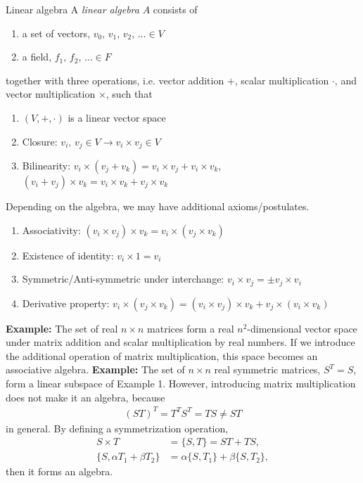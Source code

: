 \documentclass{beamer}
\begin{document}
\begin{frame}{Linear algebra}
\justify
A \textit{linear algebra} $A$ consists of
\begin{enumerate}
\item[A] a set of vectors, $v_0,\, v_1,\, v_2,\, \ldots \in V$
\item[B] a field, $f_1,\, f_2,\, \ldots \in F$
\end{enumerate}
together with three operations, i.e. vector addition $+$, scalar multiplication $\cdot$, and vector multiplication $\times$, such that
\begin{enumerate}
\item[1] $(V,+,\cdot)$ is a linear vector space
\item[2] Closure: $v_i,\, v_j\in V \rightarrow v_i \times v_j \in V$
\item[3] Bilinearity: $v_i \times (v_j + v_k) = v_i \times v_j + v_i \times v_k$, $(v_i + v_j) \times v_k = v_i \times v_k + v_j \times v_k$
\end{enumerate}
\vfill
Depending on the algebra, we may have additional axioms/postulates.
\begin{enumerate}
\item[4] Associativity: $(v_i \times v_j) \times v_k = v_i \times (v_j \times v_k)$
\item[5] Existence of identity: $v_i \times 1 = v_i$
\item[6] Symmetric/Anti-symmetric under interchange: $v_i \times v_j = \pm v_j \times v_i$
\item[7] Derivative property: $v_i \times (v_j \times v_k) = (v_i \times v_j) \times v_k + v_j \times (v_i \times v_k)$
\end{enumerate}
\end{frame}

\begin{frame}
\justify
\textbf{Example:} The set of real $n\times n$ matrices form a real $n^2$-dimensional vector space under matrix addition and scalar multiplication by real numbers. If we introduce the additional operation of matrix multiplication, this space becomes an associative algebra.
\vfill
\textbf{Example:} The set of $n\times n$ real symmetric matrices, $S^T = S$, form a linear subspace of Example 1. However, introducing matrix multiplication does not make it an algebra, because
\begin{align}
(ST)^T = T^T S^T = TS \neq ST
\end{align}
in general. By defining a symmetrization operation,
\begin{align}
S \times T & = \{S,T\} = ST + TS, \\
\{S,\alpha T_1 + \beta T_2\} & = \alpha \{S,T_1\} + \beta \{S,T_2\},
\end{align}
then it forms an algebra.
\end{frame}
\end{document}
